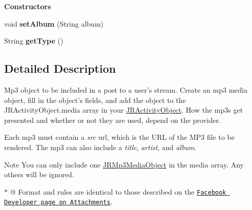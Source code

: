 \begin{Indent}{\bf Constructors}
\begin{DoxyCompactItemize}
\item 
\hypertarget{classcom_1_1janrain_1_1android_1_1engage_1_1types_1_1_j_r_mp3_media_object_ab1da656e14525319dd35aa63f4396a24}{
void {\bfseries setAlbum} (String album)}
\label{classcom_1_1janrain_1_1android_1_1engage_1_1types_1_1_j_r_mp3_media_object_ab1da656e14525319dd35aa63f4396a24}

\item 
\hypertarget{classcom_1_1janrain_1_1android_1_1engage_1_1types_1_1_j_r_mp3_media_object_a9d7e2b0287f0fcc002c0dddf3f57c697}{
String {\bfseries getType} ()}
\label{classcom_1_1janrain_1_1android_1_1engage_1_1types_1_1_j_r_mp3_media_object_a9d7e2b0287f0fcc002c0dddf3f57c697}

\end{DoxyCompactItemize}
\end{Indent}


\subsection{Detailed Description}
Mp3 object to be included in a post to a user's stream. Create an mp3 media object, fill in the object's fields, and add the object to the JRActivityObject.media array in your \hyperlink{classcom_1_1janrain_1_1android_1_1engage_1_1types_1_1_j_r_activity_object}{JRActivityObject}. How the mp3s get presented and whether or not they are used, depend on the provider.

Each mp3 must contain a {\itshape src\/} url, which is the URL of the MP3 file to be rendered. The mp3 can also include a {\itshape title\/}, {\itshape artist\/}, and {\itshape album\/}.

\begin{DoxyNote}{Note}
You can only include one \hyperlink{classcom_1_1janrain_1_1android_1_1engage_1_1types_1_1_j_r_mp3_media_object}{JRMp3MediaObject} in the media array. Any others will be ignored.
\end{DoxyNote}
$\ast$ @ Format and rules are identical to those described on the \href{http://developers.facebook.com/docs/guides/attachments}{\tt Facebook Developer page on Attachments}. 

